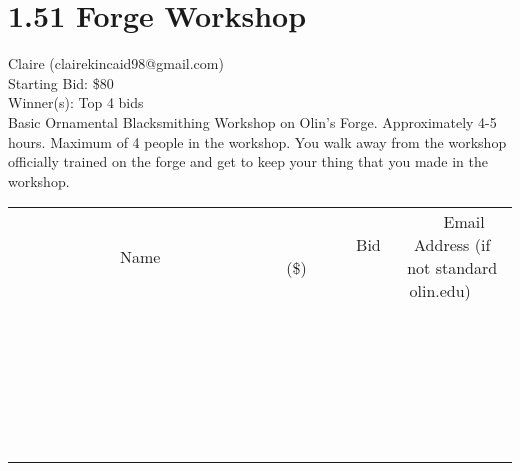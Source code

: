\documentclass[11pt]{article}
\begin{document}
\section*{1.51 Forge Workshop}
Claire  (clairekincaid98@gmail.com) \\
Starting Bid: \$80 \\
Winner(s): 
Top 4 bids \\
Basic Ornamental Blacksmithing Workshop on Olin's Forge.  Approximately 4-5 hours.  Maximum of 4 people in the workshop.  You walk away from the workshop officially trained on the forge and get to keep your thing that you made in the workshop. \\[6ex]
\begin{tabular}{c c c}
~~~~~~~~~~~~~Name~~~~~~~~~~~~~ & ~~~~~~~~~Bid (\$)~~~~~~~~~ & ~~~Email Address (if not standard olin.edu)~~~ \\
 & & \\
\hline
 & & \\
\hline
 & & \\
\hline
 & & \\
\hline
 & & \\
\hline
 & & \\
\hline
 & & \\
\hline
 & & \\
\hline
 & & \\
\hline
 & & \\
\hline
 & & \\
\hline
 & & \\
\hline
 & & \\
\hline
 & & \\
\hline
 & & \\
\hline
 & & \\
\hline
 & & \\
\hline
 & & \\
\hline
 & & \\
\hline
 & & \\
\hline
 & & \\
\hline
 & & \\
\hline
 & & \\
\hline
 & & \\
\hline
 & & \\
\hline
 & & \\
\hline
\end{tabular}
\clearpage
\end{document}

